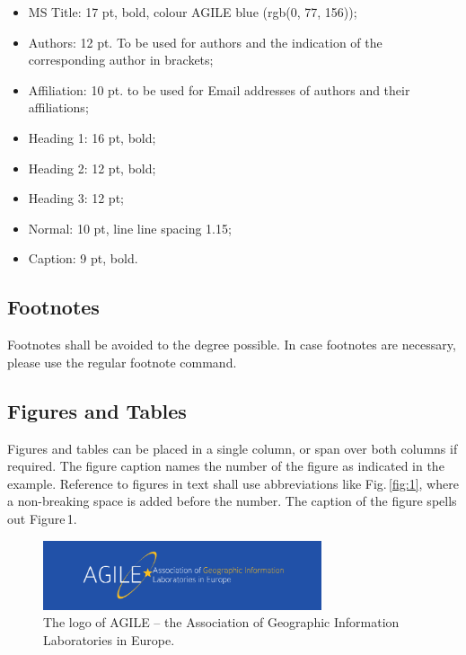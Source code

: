 \documentclass[agile, final]{copernicus-agile}
\begin{document}
\begin{itemize}[itemsep=0em plus0.2em,topsep=0.2em plus0.5em]
\item MS Title: 17 pt, bold, colour AGILE blue (rgb(0, 77, 156));
\item Authors: 12 pt. To be used for authors and the indication of the corresponding author in brackets;
\item Affiliation: 10 pt. to be used for Email addresses of authors and their affiliations;
\item Heading 1: 16 pt, bold;
\item Heading 2: 12 pt, bold;
\item Heading 3: 12 pt;
\item Normal: 10 pt, line line spacing 1.15;
\item Caption: 9 pt, bold.
\end{itemize}

\subsection{Footnotes}
Footnotes shall be avoided to the degree possible. In case footnotes are necessary, please use the regular footnote command. %


\subsection{Figures and Tables}
Figures and tables can be placed in a single column, or span over both columns if required. The figure caption names the number of the figure as indicated in the example. Reference to figures in text shall use abbreviations like Fig.\,\ref{fig:1}, where a non-breaking space is added before the number. The caption of the figure spells out Figure\,1.

\begin{figure}[ht]
  \includegraphics[width=8.2cm]{figures/agile-logo_cmyk.pdf}
\caption{The logo of AGILE -- the Association of Geographic Information Laboratories in Europe.}
\label{fig:2}       %
\end{figure}
%
\end{document}
